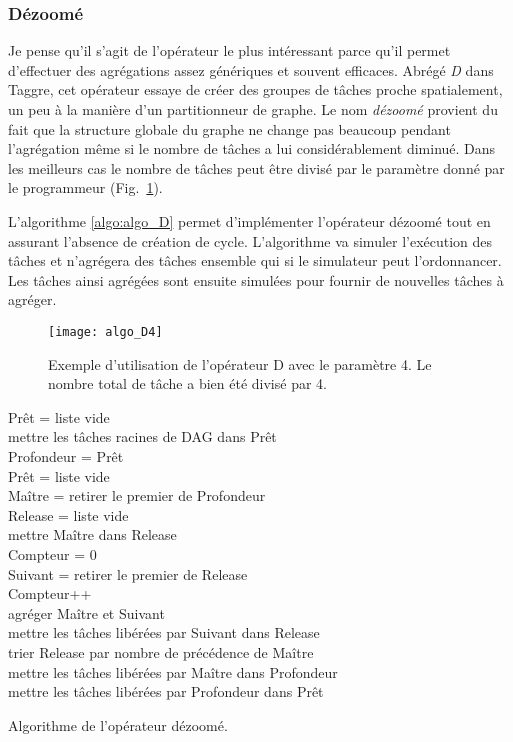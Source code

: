 \subsubsection{Dézoomé}
Je pense qu'il s'agit de l'opérateur le plus intéressant parce qu'il permet d'effectuer des agrégations assez génériques et souvent efficaces.
%
Abrégé {\em D} dans Taggre, cet opérateur essaye de créer des groupes de tâches proche spatialement, un peu à la manière d'un partitionneur de graphe.
%
Le nom {\em dézoomé} provient du fait que la structure globale du graphe ne change pas beaucoup pendant l'agrégation même si le nombre de tâches a lui considérablement diminué.
%
Dans les meilleurs cas le nombre de tâches peut être divisé par le paramètre donné par le programmeur (Fig.~\ref{fig:algo_D4}).


L'algorithme \ref{algo:algo_D} permet d'implémenter l'opérateur dézoomé tout en assurant l'absence de création de cycle.
%
L'algorithme va simuler l'exécution des tâches et n'agrégera des tâches ensemble qui si le simulateur peut l'ordonnancer.
%
Les tâches ainsi agrégées sont ensuite simulées pour fournir de nouvelles tâches à agréger.



\begin{figure}[t!]
  \centering
  \texttt{[image: algo\_D4]}
  \caption{Exemple d'utilisation de l'opérateur D avec le paramètre 4. Le nombre total de tâche a bien été divisé par 4.}
  \label{fig:algo_D4}
\end{figure}

\begin{algorithm}
  {\sc Prêt} = liste vide \\
  mettre les tâches racines de DAG dans {\sc Prêt} \\
   {
    {\sc Profondeur} = {\sc Prêt} \\
    {\sc Prêt} = liste vide \\
     {
      {\sc Maître} = retirer le premier de {\sc Profondeur} \\
      {\sc Release} = liste vide \\
      mettre {\sc Maître} dans {\sc Release} \\
      {\sc Compteur} = 0 \\
       {
        {\sc Suivant} = retirer le premier de {\sc Release} \\
        {\sc Compteur}++\\
        agréger {\sc Maître} et {\sc Suivant}\\
        mettre les tâches libérées par {\sc Suivant} dans {\sc Release} \\
        trier {\sc Release} par nombre de précédence de {\sc Maître} \\
      }
      mettre les tâches libérées par {\sc Maître} dans {\sc Profondeur} \\
    }
    mettre les tâches libérées par {\sc Profondeur} dans {\sc Prêt}\\
  }
  \caption{Algorithme de l'opérateur dézoomé.}
  \label{algo:algo_D}
\end{algorithm}
